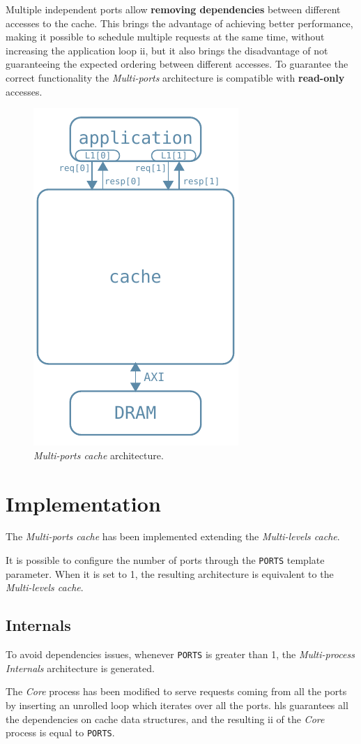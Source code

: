 \documentclass[11pt,a4paper,oneside]{memoir}
\begin{document}
\bigskip
Multiple independent ports allow \textbf{removing dependencies} between
different accesses to the cache.
This brings the advantage of achieving better performance, making it possible
to schedule multiple requests at the same time, without increasing the
application loop \ac{ii}, but it also brings the disadvantage of not
guaranteeing the expected ordering between different accesses.
To guarantee the correct functionality the \emph{Multi-ports} architecture is
compatible with \textbf{read-only} accesses.

\begin{figure}[!htb]
	\centering
	\includegraphics[width=.3\textwidth]{multi_ports_arch}
	\caption{\emph{Multi-ports cache} architecture.}
	\label{fig:multi_ports_arch}
\end{figure}

\section{Implementation}
The \emph{Multi-ports cache} has been implemented extending the
\emph{Multi-levels cache}.

It is possible to configure the number of ports through the \texttt{PORTS}
template parameter.
When it is set to 1, the resulting architecture is equivalent to the
\emph{Multi-levels cache}.

\subsection{Internals}
To avoid dependencies issues, whenever \texttt{PORTS} is greater than 1, the
\emph{Multi-process} \emph{Internals} architecture is generated.

\bigskip
The \emph{Core} process has been modified to serve requests coming from all the
ports by inserting an unrolled loop which iterates over all the ports. \ac{hls}
guarantees all the dependencies on cache data structures, and the resulting
\ac{ii} of the \emph{Core} process is equal to \texttt{PORTS}.
\end{document}
